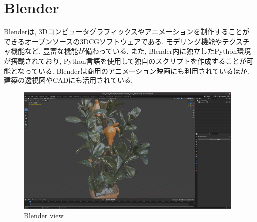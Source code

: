 \section{Blender}
Blenderは, 3Dコンピュータグラフィックスやアニメーションを制作することができるオープンソースの3DCGソフトウェアである.
モデリング機能やテクスチャ機能など, 豊富な機能が備わっている.
また, Blender内に独立したPython環境が搭載されており, Python言語を使用して独自のスクリプトを作成することが可能となっている.
Blenderは商用のアニメーション映画にも利用されているほか, 建築の透視図やCADにも活用されている.

\vspace{5mm}
\begin{figure}[H]
     \centering
     \includegraphics[width=110mm]{images/png/blenderex.png}
     \caption{Blender view}
     \label{Fig:blenderex}
   \end{figure}